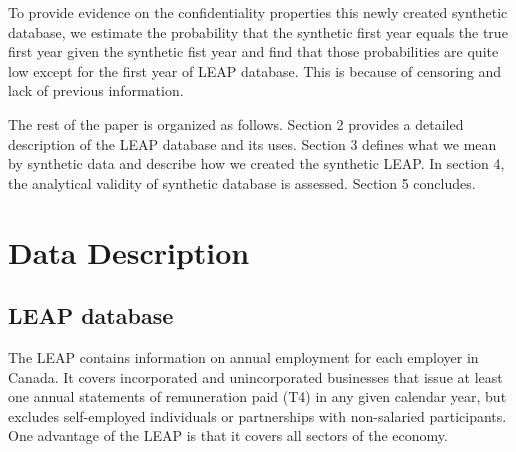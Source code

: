 \documentclass{article}
\begin{document}
To provide evidence on the confidentiality properties this newly created  synthetic database, we estimate the probability that the synthetic first year equals the true first year given the synthetic fist year and find that those probabilities are quite low except for the first year of LEAP database. This is because of censoring and lack of previous information.

The rest of the paper is organized as follows. Section 2 provides a detailed description of the LEAP database and its uses. Section 3 defines what we mean by synthetic data and describe how we created the synthetic LEAP. In section 4, the analytical validity of synthetic database is assessed. Section 5 concludes.

\section{Data Description}

\subsection{LEAP database}

The LEAP contains information on annual employment for each employer in Canada. It covers incorporated and unincorporated businesses that issue at least one annual statements of remuneration paid (T4) in any given calendar year, but excludes self-employed individuals or partnerships with non-salaried participants. One advantage of the LEAP is that it covers all sectors of the economy.%
\end{document}
